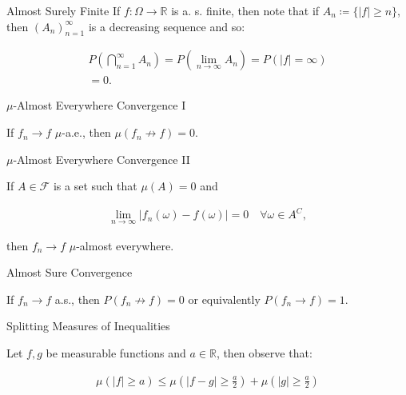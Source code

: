 \documentclass[10pt,landscape]{article}
\renewcommand{\leq}{\leqslant}
\renewcommand{\geq}{\geqslant}
\newcommand{\CalF}{\mathcal{F}}
\begin{document}
\begin{multicols}{3}
\begin{observation}{}{Almost Surely Finite}
    If $f: \Omega \to \mathbb{R}$ is a. s. finite, then note that if $A_n \coloneqq \{ |f| \geq n \}$, then $(A_n)_{n=1}^{\infty}$ is a decreasing sequence and so:

        \begin{align*}
            P\left(\bigcap_{n=1}^{\infty} A_n\right) = P\left(\lim_{n \to \infty} A_n\right) = P(|f| = \infty) \\ = 0.
        \end{align*}

\end{observation}

\begin{observation}{}{$\mu$-Almost Everywhere Convergence I}

    If $f_n \to f$ $\mu$-a.e., then $\mu(f_n \not\to f) = 0$.

\end{observation}

\begin{observation}{}{$\mu$-Almost Everywhere Convergence II}

    If $A \in \CalF$ is a set such that $\mu(A) = 0$ and

        \begin{align*}
            \lim_{n \to \infty} |f_n(\omega) - f(\omega)| = 0 \quad \forall \omega \in A^C,
        \end{align*}

    then $f_n \to f$ $\mu$-almost everywhere.

\end{observation}

\begin{observation}{}{Almost Sure Convergence}

    If $f_n \to f$ a.s., then $P(f_n \not\to f) = 0$ or equivalently $P(f_n \to f) = 1$.

\end{observation}

\begin{observation}{}{Splitting Measures of Inequalities}

    Let $f,g$ be measurable functions and $a \in \mathbb{R}$, then observe that:

        \begin{align*}
            \mu(|f| \geq a) \leq \mu\left( |f - g| \geq \frac{a}{2} \right) + \mu\left( |g| \geq \frac{a}{2} \right)
        \end{align*}

\end{observation}


\end{multicols}
\end{document}
